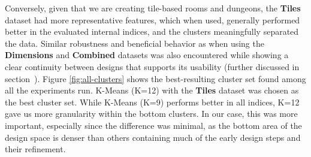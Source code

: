 
Conversely, given that we are creating tile-based rooms and dungeons, the \textbf{Tiles} dataset had more representative features, which when used, generally performed better in the evaluated internal indices, and the clusters meaningfully separated the data. Similar robustness and beneficial behavior as when using the \textbf{Dimensions} and \textbf{Combined} datasets was also encountered while showing a clear continuity between designs that supports its usability (further discussed in section~). Figure \ref{fig:all-clusters} shows the best-resulting cluster set found among all the experiments run. K-Means (K=12) with the \textbf{Tiles} dataset was chosen as the best cluster set. While K-Means (K=9) performs better in all indices, K=12 gave us more granularity within the bottom clusters. In our case, this was more important, especially since the difference was minimal, as the bottom area of the design space is denser than others containing much of the early design steps and their refinement.





